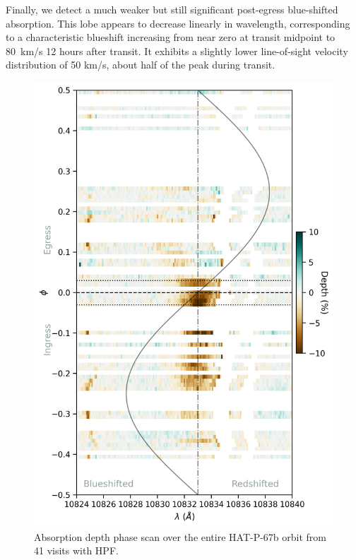 \documentclass[twocolumn]{aastex631}
\begin{document}
Finally, we detect a much weaker but still significant post-egress blue-shifted absorption.  This lobe appears to decrease linearly in wavelength, corresponding to a characteristic blueshift increasing from near zero at transit midpoint to 80~km/s 12 hours after transit.  It exhibits a slightly lower line-of-sight velocity distribution of 50 km/s, about half of the peak during transit.


\begin{figure}
    \includegraphics[width=\linewidth]{figures/phase_2D_diagram_resid.png}
    \caption{Absorption depth phase scan over the entire HAT-P-67b orbit from 41 visits with HPF.  }
    \label{fig:HPFscanResid}
\end{figure}
\end{document}
